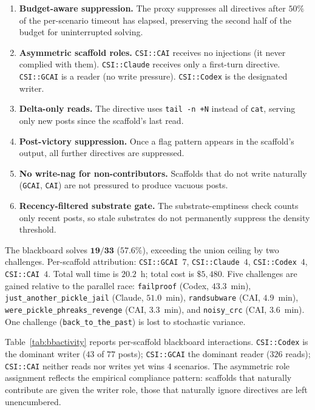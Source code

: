 \begin{enumerate}[leftmargin=*,nosep]
  \item \textbf{Budget-aware suppression.} The proxy suppresses all directives after $50\%$ of the per-scenario timeout has elapsed, preserving the second half of the budget for uninterrupted solving.
  \item \textbf{Asymmetric scaffold roles.} \texttt{CSI::CAI} receives no injections (it never complied with them). \texttt{CSI::Claude} receives only a first-turn directive. \texttt{CSI::GCAI} is a reader (no write pressure). \texttt{CSI::Codex} is the designated writer.
  \item \textbf{Delta-only reads.} The directive uses \texttt{tail -n +N} instead of \texttt{cat}, serving only new posts since the scaffold's last read.
  \item \textbf{Post-victory suppression.} Once a flag pattern appears in the scaffold's output, all further directives are suppressed.
  \item \textbf{No write-nag for non-contributors.} Scaffolds that do not write naturally (\texttt{GCAI}, \texttt{CAI}) are not pressured to produce vacuous posts.
  \item \textbf{Recency-filtered substrate gate.} The substrate-emptiness check counts only recent posts, so stale substrates do not permanently suppress the density threshold.
\end{enumerate}

The blackboard solves $\mathbf{19/33}$ ($57.6\%$), exceeding the union ceiling by two challenges. Per-scaffold attribution: \texttt{CSI::GCAI}~$7$, \texttt{CSI::Claude}~$4$, \texttt{CSI::Codex}~$4$, \texttt{CSI::CAI}~$4$. Total wall time is $20.2$~h; total cost is $\$5{,}480$. Five challenges are gained relative to the parallel race: \texttt{failproof} (Codex, $43.3$~min), \texttt{just\_another\_pickle\_jail} (Claude, $51.0$~min), \texttt{randsubware} (CAI, $4.9$~min), \texttt{were\_pickle\_phreaks\_revenge} (CAI, $3.3$~min), and \texttt{noisy\_crc} (CAI, $3.6$~min). One challenge (\texttt{back\_to\_the\_past}) is lost to stochastic variance.

Table~\ref{tab:bbactivity} reports per-scaffold blackboard interactions. \texttt{CSI::Codex} is the dominant writer ($43$ of $77$ posts); \texttt{CSI::GCAI} the dominant reader ($326$ reads); \texttt{CSI::CAI} neither reads nor writes yet wins $4$ scenarios. The asymmetric role assignment reflects the empirical compliance pattern: scaffolds that naturally contribute are given the writer role, those that naturally ignore directives are left unencumbered.

